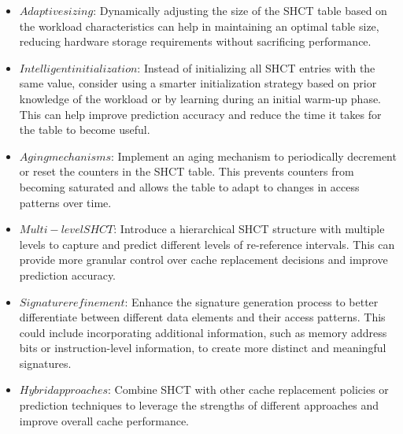 \begin{itemize}
    \item \(Adaptive sizing\): Dynamically adjusting the size of the SHCT table based on the workload characteristics can help in maintaining an optimal table size, reducing hardware storage requirements without sacrificing performance.
    \item \(Intelligent initialization\): Instead of initializing all SHCT entries with the same value, consider using a smarter initialization strategy based on prior knowledge of the workload or by learning during an initial warm-up phase. This can help improve prediction accuracy and reduce the time it takes for the table to become useful.
    \item \(Aging mechanisms\): Implement an aging mechanism to periodically decrement or reset the counters in the SHCT table. This prevents counters from becoming saturated and allows the table to adapt to changes in access patterns over time.
    \item \(Multi-level SHCT\): Introduce a hierarchical SHCT structure with multiple levels to capture and predict different levels of re-reference intervals. This can provide more granular control over cache replacement decisions and improve prediction accuracy.
    \item \(Signature refinement\): Enhance the signature generation process to better differentiate between different data elements and their access patterns. This could include incorporating additional information, such as memory address bits or instruction-level information, to create more distinct and meaningful signatures.
    \item \(Hybrid approaches\): Combine SHCT with other cache replacement policies or prediction techniques to leverage the strengths of different approaches and improve overall cache performance.
\end{itemize}